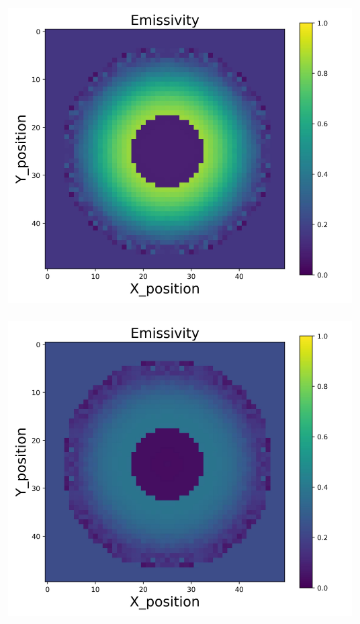 \begin{figure}[p]
\begin{minipage}{\textwidth}
\begin{subfigure}{0.325\textwidth}
        \end{subfigure}
        \begin{subfigure}{0.325\textwidth}
            \centering
            \includegraphics[width=\textwidth]{figures/raw_data/23/mix/emi_cal.jpg}
        \end{subfigure}
        \begin{subfigure}{0.325\textwidth}
            \centering
            \includegraphics[width=\textwidth]{figures/raw_data/24/mix/emi_cal.jpg}

\end{subfigure}
\end{minipage}
\end{figure}
